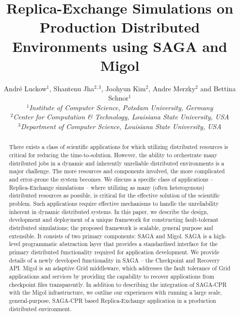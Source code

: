 \documentclass[conference,final]{IEEEtran}
\title{Replica-Exchange Simulations on Production Distributed
  Environments using SAGA and Migol}
\author{
  Andr\'e Luckow$^{1}$, Shantenu Jha$^{2,3}$, Joohyun Kim$^{2}$, Andre Merzky$^{2}$ and Bettina Schnor$^{1}$\\
  \small{\emph{$^{1}$Institute of Computer Science, Potsdam University, Germany}}\\
  \small{\emph{$^{2}$Center for Computation \& Technology, Louisiana State University, USA}}\\
  \small{\emph{$^{3}$Department of Computer Science, Louisiana State University, USA}}\\
}
\begin{document}
 


\maketitle    

\begin{abstract}
  There exists a class of scientific applications for which utilizing
  distributed resources is critical for reducing the
  time-to-solution. However, the ability to orchestrate many
  distributed jobs in a dynamic and inherently unreliable distributed
  environments is a major challenge. The more resources and components
  involved, %
  the more complicated and error-prone the system becomes. We discuss
  a specific class of applications -- Replica-Exchange simulations
  -- where utilizing as many (often heterogenous) distributed
  resources as possible, is critical for the effective solution of the
  scientific problem. Such applications require effective mechanisms
  to handle the unreliability inherent in dynamic distributed systems.
  In this paper, we describe the design, development and deployment of
  a unique framework for constructing fault-tolerant distributed
  simulations; %
  the proposed framework is scalable, general purpose and
  extensible. It consists of two primary components: SAGA and Migol.
  SAGA is a high-level programmatic abstraction layer that provides a
  standardised interface for the primary distributed functionality
  required for application development. We provide details of a newly
  developed functionality in SAGA -- the Checkpoint and Recovery
  API. Migol is an adaptive Grid middleware, which addresses the fault
  tolerance of Grid applications and services by providing the
  capability to recover applications from checkpoint files
  transparently.  In addition to describing
  the integration of SAGA-CPR with the Migol infrastructure, 
  we outline our experiences with
  running a large scale, general-purpose, SAGA-CPR based
  Replica-Exchange application in a production distributed
  environment.

    

\end{abstract}
\end{document}
